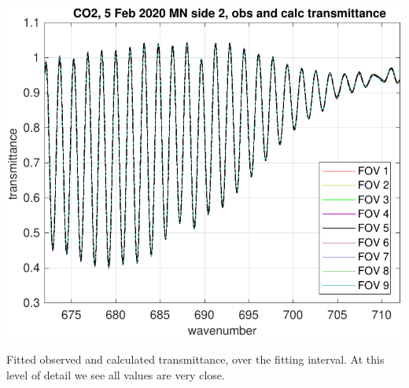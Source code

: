 \documentclass[9pt]{beamer}
\begin{document}
\begin{frame}
\begin{columns}[t]
\begin{column}{0.5\textwidth}
  \begin{centering}
  \includegraphics[width=\textwidth]{02-05_mn_s2_CO2/CO2_obs_and_calc.pdf}
  \end{centering}\vspace{3mm}

Fitted observed and calculated transmittance, over the fitting
interval.  At this level of detail we see all values are very close.

\end{column}
\end{columns}
\end{frame}
\end{document}
